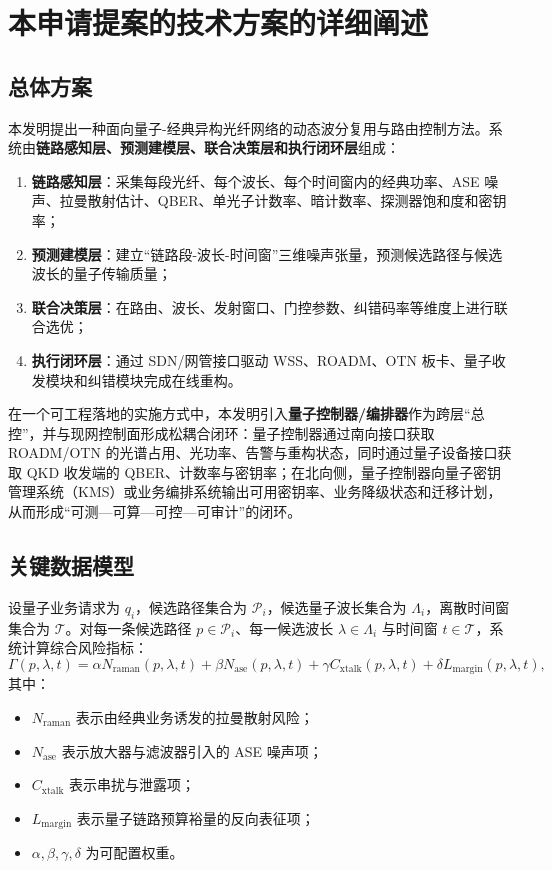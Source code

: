 \documentclass[12pt,a4paper]{article}
\begin{document}
\section{本申请提案的技术方案的详细阐述}

\subsection{总体方案}

本发明提出一种面向量子-经典异构光纤网络的动态波分复用与路由控制方法。系统由\textbf{链路感知层、预测建模层、联合决策层和执行闭环层}组成：
\begin{enumerate}[label=(\arabic*)]
    \item \textbf{链路感知层}：采集每段光纤、每个波长、每个时间窗内的经典功率、ASE 噪声、拉曼散射估计、QBER、单光子计数率、暗计数率、探测器饱和度和密钥率；
    \item \textbf{预测建模层}：建立“链路段-波长-时间窗”三维噪声张量，预测候选路径与候选波长的量子传输质量；
    \item \textbf{联合决策层}：在路由、波长、发射窗口、门控参数、纠错码率等维度上进行联合选优；
    \item \textbf{执行闭环层}：通过 SDN/网管接口驱动 WSS、ROADM、OTN 板卡、量子收发模块和纠错模块完成在线重构。
\end{enumerate}

在一个可工程落地的实施方式中，本发明引入\textbf{量子控制器/编排器}作为跨层“总控”，并与现网控制面形成松耦合闭环：量子控制器通过南向接口获取 ROADM/OTN 的光谱占用、光功率、告警与重构状态，同时通过量子设备接口获取 QKD 收发端的 QBER、计数率与密钥率；在北向侧，量子控制器向量子密钥管理系统（KMS）或业务编排系统输出可用密钥率、业务降级状态和迁移计划，从而形成“可测---可算---可控---可审计”的闭环。

\subsection{关键数据模型}

设量子业务请求为 $q_i$，候选路径集合为 $\mathcal{P}_i$，候选量子波长集合为 $\Lambda_i$，离散时间窗集合为 $\mathcal{T}$。对每一条候选路径 $p \in \mathcal{P}_i$、每一候选波长 $\lambda \in \Lambda_i$ 与时间窗 $t \in \mathcal{T}$，系统计算综合风险指标：
\[
\Gamma(p,\lambda,t)=\alpha N_{\mathrm{raman}}(p,\lambda,t)
+\beta N_{\mathrm{ase}}(p,\lambda,t)
+\gamma C_{\mathrm{xtalk}}(p,\lambda,t)
+\delta L_{\mathrm{margin}}(p,\lambda,t),
\]
其中：
\begin{itemize}[noitemsep]
    \item $N_{\mathrm{raman}}$ 表示由经典业务诱发的拉曼散射风险；
    \item $N_{\mathrm{ase}}$ 表示放大器与滤波器引入的 ASE 噪声项；
    \item $C_{\mathrm{xtalk}}$ 表示串扰与泄露项；
    \item $L_{\mathrm{margin}}$ 表示量子链路预算裕量的反向表征项；
    \item $\alpha,\beta,\gamma,\delta$ 为可配置权重。
\end{itemize}
\end{document}
